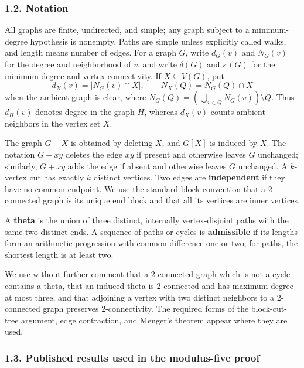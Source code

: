 \documentclass[
  11pt]{article}
\let\papersubsection\subsubsection
\renewcommand{\subsubsection}{\Needspace{7\baselineskip}\papersubsection}
\begin{document}
\subsubsection{1.2. Notation}\label{notation}

All graphs are finite, undirected, and simple; any graph subject to a
minimum-degree hypothesis is nonempty. Paths are simple unless
explicitly called walks, and length means number of edges. For a graph
\(G\), write \(d_G(v)\) and \(N_G(v)\) for the degree and neighborhood
of \(v\), and write \(\delta(G)\) and \(\kappa(G)\) for the minimum
degree and vertex connectivity. If \(X\subseteq V(G)\), put \[
 d_X(v)=|N_G(v)\cap X|,
 \qquad
 N_X(Q)=N_G(Q)\cap X
\] when the ambient graph is clear, where
\(N_G(Q)=\left(\bigcup_{v\in Q}N_G(v)\right)\setminus Q\). Thus
\(d_H(v)\) denotes degree in the graph \(H\), whereas \(d_X(v)\) counts
ambient neighbors in the vertex set \(X\).

The graph \(G-X\) is obtained by deleting \(X\), and \(G[X]\) is induced
by \(X\). The notation \(G-xy\) deletes the edge \(xy\) if present and
otherwise leaves \(G\) unchanged; similarly, \(G+xy\) adds the edge if
absent and otherwise leaves \(G\) unchanged. A \(k\)-vertex cut has
exactly \(k\) distinct vertices. Two edges are \textbf{independent} if
they have no common endpoint. We use the standard block convention that
a 2-connected graph is its unique end block and that all its vertices
are inner vertices.

A \textbf{theta} is the union of three distinct, internally
vertex-disjoint paths with the same two distinct ends. A sequence of
paths or cycles is \textbf{admissible} if its lengths form an arithmetic
progression with common difference one or two; for paths, the shortest
length is at least two.

We use without further comment that a 2-connected graph which is not a
cycle contains a theta, that an induced theta is 2-connected and has
maximum degree at most three, and that adjoining a vertex with two
distinct neighbors to a 2-connected graph preserves 2-connectivity. The
required forms of the block-cut-tree argument, edge contraction, and
Menger's theorem appear where they are used.

\subsubsection{1.3. Published results used in the modulus-five
proof}\label{published-results-used-in-the-modulus-five-proof}
\end{document}
